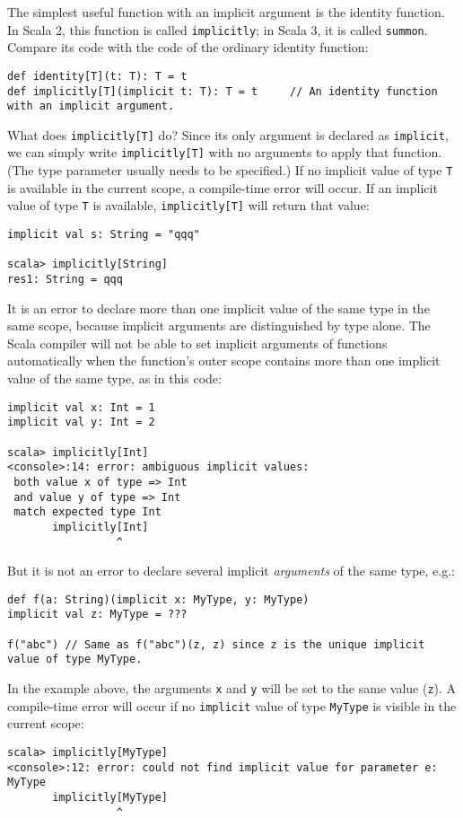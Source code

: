 The simplest useful function with an implicit argument is the identity
function. In Scala 2, this function is called \lstinline!implicitly!;
in Scala 3, it is called \lstinline!summon!. Compare its code with
the code of the ordinary identity function:
\begin{lstlisting}
def identity[T](t: T): T = t
def implicitly[T](implicit t: T): T = t     // An identity function with an implicit argument.
\end{lstlisting}
What does \lstinline!implicitly[T]! do? Since its only argument is
declared as \lstinline!implicit!, we can simply write \lstinline!implicitly[T]!
with no arguments to apply that function. (The type parameter usually
needs to be specified.) If no implicit value of type \lstinline!T!
is available in the current scope, a compile-time error will occur.
If an implicit value of type \lstinline!T! is available, \lstinline!implicitly[T]!
will return that value:
\begin{lstlisting}
implicit val s: String = "qqq"

scala> implicitly[String]
res1: String = qqq
\end{lstlisting}

It is an error to declare more than one implicit value of the same
type in the same scope, because implicit arguments are distinguished
by type alone. The Scala compiler will not be able to set implicit
arguments of functions automatically when the function\textsf{'}s outer scope
contains more than one implicit value of the same type, as in this
code:
\begin{lstlisting}
implicit val x: Int = 1
implicit val y: Int = 2

scala> implicitly[Int]
<console>:14: error: ambiguous implicit values:
 both value x of type => Int
 and value y of type => Int
 match expected type Int
       implicitly[Int]
                 ^
\end{lstlisting}
But it is not an error to declare several implicit \emph{arguments}
of the same type, e.g.:
\begin{lstlisting}
def f(a: String)(implicit x: MyType, y: MyType)
implicit val z: MyType = ???

f("abc") // Same as f("abc")(z, z) since z is the unique implicit value of type MyType.
\end{lstlisting}
In the example above, the arguments \lstinline!x! and \lstinline!y!
will be set to the same value (\lstinline!z!). A compile-time error
will occur if no \lstinline!implicit! value of type \lstinline!MyType!
is visible in the current scope:
\begin{lstlisting}
scala> implicitly[MyType]
<console>:12: error: could not find implicit value for parameter e: MyType
       implicitly[MyType]
                 ^
\end{lstlisting}


